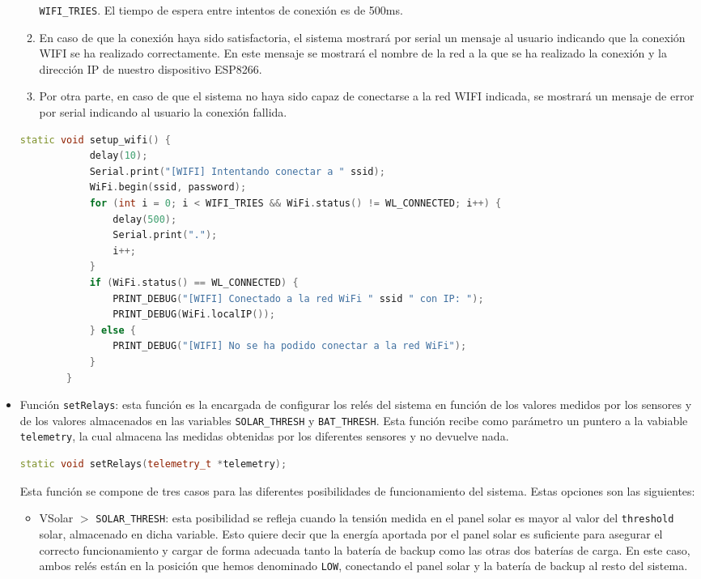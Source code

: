 \begin{itemize}
\begin{enumerate}
        \texttt{WIFI\_TRIES}. El tiempo de espera entre intentos de conexión es de 500ms.
        \item En caso de que la conexión haya sido satisfactoria, el sistema mostrará por serial un mensaje al usuario indicando que la conexión WIFI se ha realizado correctamente. En este mensaje se mostrará el nombre de la red a la que se ha realizado la conexión y la dirección IP de nuestro dispositivo ESP8266.
        \item Por otra parte, en caso de que el sistema no haya sido capaz de conectarse a la red WIFI indicada, se mostrará un mensaje de error por serial indicando al usuario la conexión fallida.
    \end{enumerate}
    \begin{lstlisting}[captionpos=b, caption={Desarrollo función setup\_wifi}, language=c++]
        static void setup_wifi() {
            delay(10);
            Serial.print("[WIFI] Intentando conectar a " ssid);
            WiFi.begin(ssid, password);
            for (int i = 0; i < WIFI_TRIES && WiFi.status() != WL_CONNECTED; i++) {
                delay(500);
                Serial.print(".");
                i++;
            }
            if (WiFi.status() == WL_CONNECTED) {
                PRINT_DEBUG("[WIFI] Conectado a la red WiFi " ssid " con IP: ");
                PRINT_DEBUG(WiFi.localIP());
            } else {
                PRINT_DEBUG("[WIFI] No se ha podido conectar a la red WiFi");
            }
        }
    \end{lstlisting}
    \item Función \texttt{setRelays}: esta función es la encargada de configurar los relés del sistema en función de los valores medidos por los sensores y de los valores almacenados en las variables \texttt{SOLAR\_THRESH} y \texttt{BAT\_THRESH}. Esta función recibe como parámetro un puntero a la vabiable \texttt{telemetry}, la cual almacena las medidas obtenidas por los diferentes sensores y no devuelve nada.
    \begin{lstlisting}[captionpos=b, caption={Definición función setRelays}, language=c++]
        static void setRelays(telemetry_t *telemetry);
    \end{lstlisting}
    Esta función se compone de tres casos para las diferentes posibilidades de funcionamiento del sistema. Estas opciones son las siguientes:
    \begin{itemize}
        \item VSolar $>$ \texttt{SOLAR\_THRESH}: esta posibilidad se refleja cuando la tensión medida en el panel solar es mayor al valor del \texttt{threshold} solar, almacenado en dicha variable. Esto quiere decir que la energía aportada por el panel solar es suficiente para asegurar el correcto funcionamiento y cargar de forma adecuada tanto la batería de backup como las otras dos baterías de carga. En este caso, ambos relés están en la posición que hemos denominado \texttt{LOW}, conectando el panel solar y la batería de backup al resto del sistema.

\end{itemize}
\end{itemize}
